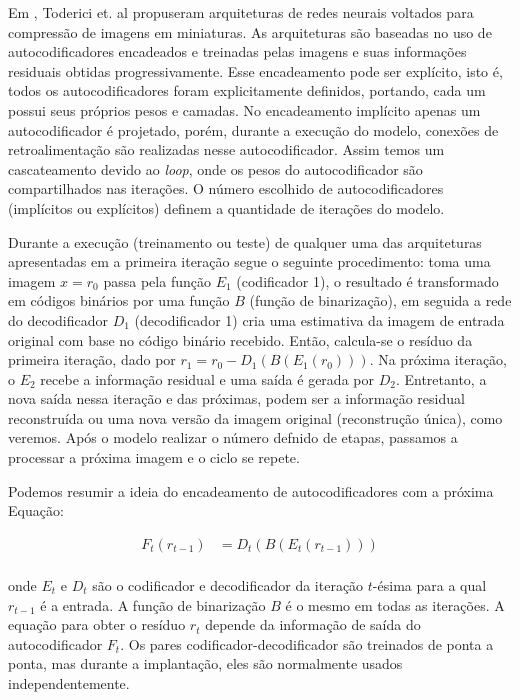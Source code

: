 Em \cite{Variable2016Toderici}, Toderici et. al propuseram arquiteturas de redes neurais voltados para compressão de imagens em miniaturas. As arquiteturas são baseadas no uso de autocodificadores encadeados e treinadas pelas imagens e suas informações residuais obtidas progressivamente. 
Esse encadeamento pode ser explícito, isto é, todos os autocodificadores foram explicitamente definidos, portando, cada um possui seus próprios pesos e camadas. 
No encadeamento implícito apenas um autocodificador é projetado, porém, durante a execução do modelo, conexões de retroalimentação são realizadas nesse autocodificador. Assim temos um cascateamento devido ao \textit{loop}, onde os pesos do autocodificador são compartilhados nas iterações. O número escolhido de autocodificadores (implícitos ou explícitos)  definem a quantidade de iterações do modelo. 

Durante a execução (treinamento ou teste) de qualquer uma das arquiteturas apresentadas em \cite{Variable2016Toderici} a primeira iteração segue o seguinte procedimento: toma uma imagem $x = r_0$ passa pela função $E_1$ (codificador 1), o resultado é transformado em códigos binários por uma função $B$ (função de binarização), em seguida a rede do decodificador $D_1$ (decodificador 1) cria uma estimativa da imagem de entrada original com base no código binário recebido. Então, calcula-se o resíduo da primeira iteração, dado por $r_1 = r_0 - D_1(B(E_1(r_0)))$. 
Na próxima iteração, o $E_2$ recebe a informação residual e uma  saída é gerada por $D_2$.   Entretanto,  a nova saída nessa iteração e das próximas, podem ser a informação residual reconstruída ou uma nova versão da imagem original (reconstrução única), como veremos.  Após o modelo realizar o número defnido de etapas, passamos a processar a próxima imagem e o ciclo se repete. 

Podemos resumir a ideia do encadeamento de autocodificadores com a próxima Equação: 

\begin{equation}
\begin{aligned}
F_t(r_{t-1}) &= D_t(B(E_t(r_{t-1}))) \\
\end{aligned}
\end{equation}

onde $E_t$ e $D_t$ são o codificador e decodificador da iteração $t$-ésima para a qual $ r_{t-1}$ é a entrada. A função de binarização $B$ é o mesmo em todas as iterações. A equação para obter o resíduo $r_t$ depende da informação de saída do autocodificador $F_t$.  Os pares codificador-decodificador são treinados de ponta a ponta, mas durante a implantação, eles são normalmente usados independentemente.

